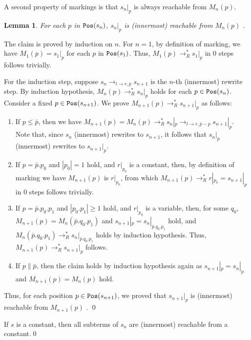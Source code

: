 \documentclass{LMCS}
\theoremstyle{plain}
\newtheorem{lemma}[thm]{Lemma}
\newcommand\Pos{{\tt Pos}}
\begin{document}
A second property of markings is that
$s_n|_p$ is always reachable from $M_n(p)$.
\begin{lemma}\label{lemma-reach1}
For each $p$ in $\Pos(s_n)$,
$s_n|_p$ is (innermost) reachable from $M_n(p)$ .
\end{lemma}
\proof
The claim is proved by induction on $n$.
For $n=1$, by definition of marking, we have $M_1(p)=s_1|_p$ for
each $p$ in ${\tt Pos}(s_1)$. Thus,
$M_1(p)\to_R^*s_1|_p$ in $0$ steps follows trivially.

For the induction step,
suppose $s_n \rightarrow_{l\rightarrow r,\bar{p}} s_{n+1}$ is the
$n$-th (innermost) rewrite step.
By induction hypothesis, $M_n(p)\to_R^*s_n|_{p}$ holds for each $p\in{\tt Pos}(s_n)$.
Consider a fixed $p\in\Pos(s_{n+1})$. We prove
$M_{n+1}(p)\to_R^*s_{n+1}|_{p}$ as follows:

\begin{enumerate}[$\bullet$]
\item If $p\leq \bar{p}$, then we have
$M_{n+1}(p) = M_{n}(p)\rightarrow_R^* s_n|_{p}\rightarrow_{l\rightarrow
r,\bar{p}-p} s_{n+1}|_{p}$. 
Note that, since $s_n$ (innermost) rewrites to $s_{n+1}$, it follows that
$s_{n}|_{p}$ (innermost) rewrites to $s_{n+1}|_{p}$.

\item If $p = \bar{p}.p_0$ and $|p_0|=1$ hold, and $r|_{p_0}$ is a constant, then,
by definition of marking we have $M_{n+1}(p)$ is $r|_{p_0}$,
from which $M_{n+1}(p)\to_R^*r|_{p_0}=s_{n+1}|_{p}$
in $0$ steps follows trivially.

\item If $p = \bar{p}.p_0.p_1$ and $|p_0.p_1|\geq 1$ hold,
and $r|_{p_0}$ is a variable,
then, for some $q_0$,
$M_{n+1}(p) = M_{n}(\bar{p}.q_0.p_1)$ and
$s_{n+1}|_{p} = s_n|_{\bar{p}.q_0.p_1}$ hold, and
$M_{n}(\bar{p}.q_0.p_1)\to_R^*s_n|_{\bar{p}.q_0.p_1}$ holds
by induction hypothesis. Thus,
$M_{n+1}(p)\to_R^*s_{n+1}|_{p}$ follows.

\item If $p\parallel \bar{p}$, then the claim holds by induction
hypothesis again as
$s_{n+1}|_{p}=s_n|_{p}$ and $M_{n+1}(p)=M_{n}(p)$ hold.
\end{enumerate}
Thus, for each position $p\in\Pos(s_{n+1})$, we proved that
$s_{n+1}|_p$ is (innermost) reachable from $M_{n+1}(p)$ .
\qed


\begin{cor}\label{corollary-reach1}
If $s$ is a constant, then all subterms of $s_n$
are (innermost) reachable from a constant.\qed
\end{cor}
\end{document}
